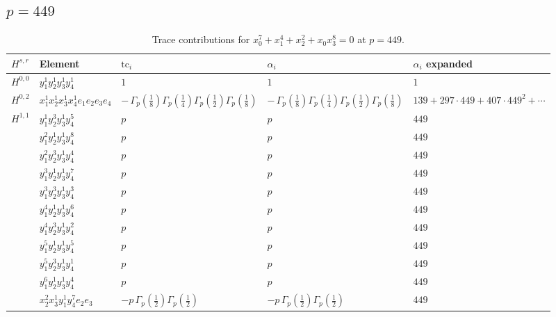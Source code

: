 \documentclass[11pt]{article}
\begin{document}
\subsection*{$p = 449$}

\begin{table}[ht]
\centering
\caption{Trace contributions for $x_0^{7} + x_1^{4} + x_2^{2} + x_0 x_3^{8} = 0$ at $p=449$.}\label{tab:deformed-68}
\renewcommand{\arraystretch}{1.1}
{\scriptsize
\begin{tabular}{@{}lllll@{}}
\toprule
$H^{s,r}$ & Element & $\mathrm{tc}_i$ & $\alpha_i$ & $\alpha_i$ expanded \\
\midrule
$H^{0,0}$ & $y_{1}^{1} y_{2}^{1} y_{3}^{1} y_{4}^{1}$ & $1$ & $1$ & $1$ \\
\midrule
$H^{0,2}$ & $x_{1}^{1} x_{2}^{1} x_{3}^{1} x_{4}^{1}  e_{1} e_{2} e_{3} e_{4}$ & $- \, \Gamma_p \left( \frac{1}{8} \right) \Gamma_p \left( \frac{1}{4} \right) \Gamma_p \left( \frac{1}{2} \right) \Gamma_p \left( \frac{1}{8} \right)$ & $- \, \Gamma_p \left( \frac{1}{8} \right) \Gamma_p \left( \frac{1}{4} \right) \Gamma_p \left( \frac{1}{2} \right) \Gamma_p \left( \frac{1}{8} \right)$ & $139{+}297{\cdot}449{+}407{\cdot}449^{2}{+}\cdots$ \\
\midrule
$H^{1,1}$ & $y_{1}^{1} y_{2}^{3} y_{3}^{1} y_{4}^{5}$ & $p \,$ & $p \,$ & $449$ \\
 & $y_{1}^{2} y_{2}^{1} y_{3}^{1} y_{4}^{8}$ & $p \,$ & $p \,$ & $449$ \\
 & $y_{1}^{2} y_{2}^{3} y_{3}^{1} y_{4}^{4}$ & $p \,$ & $p \,$ & $449$ \\
 & $y_{1}^{3} y_{2}^{1} y_{3}^{1} y_{4}^{7}$ & $p \,$ & $p \,$ & $449$ \\
 & $y_{1}^{3} y_{2}^{3} y_{3}^{1} y_{4}^{3}$ & $p \,$ & $p \,$ & $449$ \\
 & $y_{1}^{4} y_{2}^{1} y_{3}^{1} y_{4}^{6}$ & $p \,$ & $p \,$ & $449$ \\
 & $y_{1}^{4} y_{2}^{3} y_{3}^{1} y_{4}^{2}$ & $p \,$ & $p \,$ & $449$ \\
 & $y_{1}^{5} y_{2}^{1} y_{3}^{1} y_{4}^{5}$ & $p \,$ & $p \,$ & $449$ \\
 & $y_{1}^{5} y_{2}^{3} y_{3}^{1} y_{4}^{1}$ & $p \,$ & $p \,$ & $449$ \\
 & $y_{1}^{6} y_{2}^{1} y_{3}^{1} y_{4}^{4}$ & $p \,$ & $p \,$ & $449$ \\
 & $x_{2}^{2} x_{3}^{1} y_{1}^{1} y_{4}^{7} e_{2} e_{3}$ & $- p \, \Gamma_p \left( \frac{1}{2} \right) \Gamma_p \left( \frac{1}{2} \right)$ & $- p \, \Gamma_p \left( \frac{1}{2} \right) \Gamma_p \left( \frac{1}{2} \right)$ & $449$ \\

\end{tabular}}
\end{table}
\end{document}
